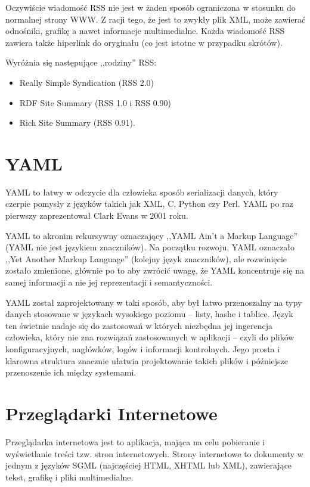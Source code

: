 \documentclass[a4paper,12pt,oneside]{report}
\begin{document}
Oczywiście wiadomość RSS nie jest w żaden sposób ograniczona w stosunku do normalnej strony WWW. Z racji tego, że jest to zwykły plik XML, może zawierać odnośniki, grafikę a nawet informacje multimedialne. Każda wiadomość RSS zawiera także hiperlink do oryginału (co jest istotne w przypadku skrótów). 

Wyróżnia się następujące ,,rodziny'' RSS:
\begin{itemize}
  \item Really Simple Syndication (RSS 2.0)
  \item RDF Site Summary (RSS 1.0 i RSS 0.90)
  \item Rich Site Summary (RSS 0.91).
\end{itemize}

\section{YAML}
\label{sec:yaml}
YAML to łatwy w odczycie dla człowieka sposób serializacji danych, który czerpie pomysły z języków takich jak XML, C, Python czy Perl. YAML po raz pierwszy zaprezentował Clark Evans w 2001 roku.

YAML to akronim rekursywny oznaczający ,,YAML Ain't a Markup Language'' (YAML nie jest językiem znaczników). Na początku rozwoju, YAML oznaczało ,,Yet Another Markup Language'' (kolejny język znaczników), ale rozwinięcie zostało zmienione, głównie po to aby zwrócić uwagę, że YAML koncentruje się na samej informacji a nie jej reprezentacji i semantyczności.

YAML został zaprojektowany w taki sposób, aby był łatwo przenoszalny na typy danych stosowane w językach wysokiego poziomu -- listy, hashe i tablice. Język ten świetnie nadaje się do zastosowań w których niezbędna jej ingerencja człowieka, który nie zna rozwiązań zastosowanych w aplikacji -- czyli do plików konfiguracyjnych, nagłówków, logów i informacji kontrolnych. Jego prosta i klarowna struktura znacznie ułatwia projektowanie takich plików i późniejsze przenoszenie ich między systemami.

\section{Przeglądarki Internetowe}
\label{sec:przegladarki}

Przeglądarka internetowa jest to aplikacja, mająca na celu pobieranie i wyświetlanie treści tzw. stron internetowych. Strony internetowe to dokumenty w jednym z języków SGML (najczęściej HTML, XHTML lub XML), zawierające tekst, grafikę i pliki multimedialne.
\end{document}
